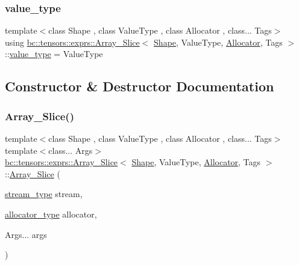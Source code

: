 \subsubsection{\texorpdfstring{value\+\_\+type}{value\_type}}
{\footnotesize\ttfamily template$<$class Shape , class Value\+Type , class Allocator , class... Tags$>$ \\
using \hyperlink{classbc_1_1tensors_1_1exprs_1_1Array__Slice}{bc\+::tensors\+::exprs\+::\+Array\+\_\+\+Slice}$<$ \hyperlink{structbc_1_1Shape}{Shape}, Value\+Type, \hyperlink{classbc_1_1allocators_1_1Allocator}{Allocator}, Tags $>$\+::\hyperlink{classbc_1_1tensors_1_1exprs_1_1Array__Slice_a36743c3a0824cf194998da96bbb95e47}{value\+\_\+type} =  Value\+Type}



\subsection{Constructor \& Destructor Documentation}
\mbox{\label{classbc_1_1tensors_1_1exprs_1_1Array__Slice_a3e7c54724b0e53e00ad3f4ece4ead243}} 
\subsubsection{\texorpdfstring{Array\+\_\+\+Slice()}{Array\_Slice()}}
{\footnotesize\ttfamily template$<$class Shape , class Value\+Type , class Allocator , class... Tags$>$ \\
template$<$class... Args$>$ \\
\hyperlink{classbc_1_1tensors_1_1exprs_1_1Array__Slice}{bc\+::tensors\+::exprs\+::\+Array\+\_\+\+Slice}$<$ \hyperlink{structbc_1_1Shape}{Shape}, Value\+Type, \hyperlink{classbc_1_1allocators_1_1Allocator}{Allocator}, Tags $>$\+::\hyperlink{classbc_1_1tensors_1_1exprs_1_1Array__Slice}{Array\+\_\+\+Slice} (\begin{DoxyParamCaption}\item[{\hyperlink{classbc_1_1tensors_1_1exprs_1_1Array__Slice_a73ab693dcce17b3bf37747b2e91a2fb2}{stream\+\_\+type}}]{stream,  }\item[{\hyperlink{classbc_1_1tensors_1_1exprs_1_1Array__Slice_a54761123998b091676d1b0deef26d376}{allocator\+\_\+type}}]{allocator,  }\item[{Args...}]{args }\end{DoxyParamCaption})\hspace{0.3cm}{\ttfamily [inline]}}



